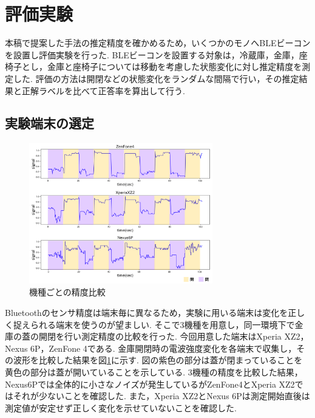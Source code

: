 \documentclass[Japanese]{dicomopapers}
\begin{document}


\section{評価実験}

本稿で提案した手法の推定精度を確かめるため，いくつかのモノへBLEビーコンを設置し評価実験を行った.
BLEビーコンを設置する対象は，冷蔵庫，金庫，座椅子とし，金庫と座椅子については移動を考慮した状態変化に対し推定精度を測定した.
評価の方法は開閉などの状態変化をランダムな間隔で行い，その推定結果と正解ラベルを比べて正答率を算出して行う.

\subsection{実験端末の選定}

\begin{figure}[ht]
    \centering
    \includegraphics[width=8cm]{mix.png}
    \caption{機種ごとの精度比較}
    \label{multi-data}
\end{figure}

Bluetoothのセンサ精度は端末毎に異なるため，実験に用いる端末は変化を正しく捉えられる端末を使うのが望ましい.
そこで3機種を用意し，同一環境下で金庫の蓋の開閉を行い測定精度の比較を行った.
今回用意した端末はXperia XZ2，Nexus 6P，ZenFone 4である.
金庫開閉時の電波強度変化を各端末で収集し，その波形を比較した結果を図\ref{multi-data}に示す.
図の紫色の部分は蓋が閉まっていることを黄色の部分は蓋が開いていることを示している.
3機種の精度を比較した結果，Nexus6Pでは全体的に小さなノイズが発生しているがZenFone4とXperia XZ2ではそれが少ないことを確認した.
また，Xperia XZ2とNexus 6Pは測定開始直後は測定値が安定せず正しく変化を示せていないことを確認した.
\end{document}
